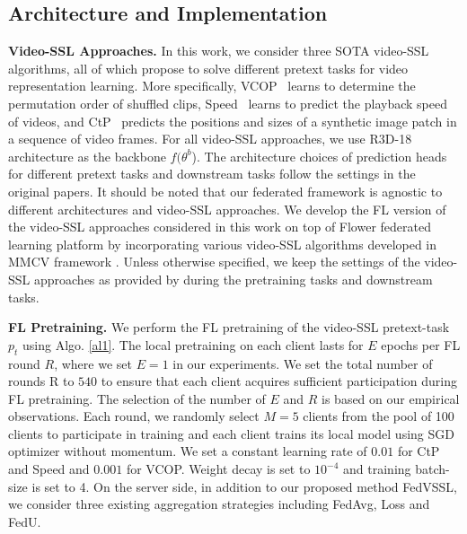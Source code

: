 \subsection{Architecture and Implementation}
\label{section:Archiecture and Implementation}
\textbf{Video-SSL Approaches.} In this work, we consider three SOTA video-SSL algorithms, all of which propose to solve different pretext tasks for video representation learning. More specifically, VCOP~\cite{xu2019self} learns to determine the permutation order of shuffled clips, Speed~\cite{benaim2020speednet,yao2020video,cho2021self} learns to predict the playback speed of videos, and CtP~\cite{wang2021unsupervised} predicts the positions and sizes of a synthetic image patch in a sequence of video frames. 
For all video-SSL approaches, we use R3D-18 \cite{tran2018closer} architecture as the backbone $f(\theta^{b}$). The architecture choices of prediction heads for different pretext tasks and downstream tasks follow the settings in the original papers. It should be noted that our federated framework is agnostic to different architectures and video-SSL approaches. We develop the FL version of the video-SSL approaches considered in this work on top of Flower \cite{beutel2020flower} federated learning platform by incorporating various video-SSL algorithms developed in MMCV framework \cite{mmcv,wang2021unsupervised}.     
Unless otherwise specified, we keep the settings of the video-SSL approaches as provided by \cite{wang2021unsupervised} during the pretraining tasks and downstream tasks. 


\noindent \textbf{FL Pretraining.} We perform the FL pretraining of the video-SSL pretext-task $p_{t}$ using Algo. \ref{al1}. The local pretraining on each client lasts for $E$ epochs per FL round $R$, where we set $E=1$ in our experiments. 
We set the total number of rounds R to $540$ to ensure that each client acquires sufficient participation during FL pretraining.
The selection of the number of $E$ and $R$ is based on our empirical observations. Each round, we randomly select $M=5$ clients from the pool of 100 clients to participate in training and each client trains its local model using SGD optimizer without momentum. We set a constant learning rate of $0.01$ for CtP and Speed and $0.001$ for VCOP. Weight decay is set to $10^{-4}$ and training batch-size is set to 4. On the server side, in addition to our proposed method FedVSSL, we consider three existing aggregation strategies including FedAvg, Loss and FedU.
 
